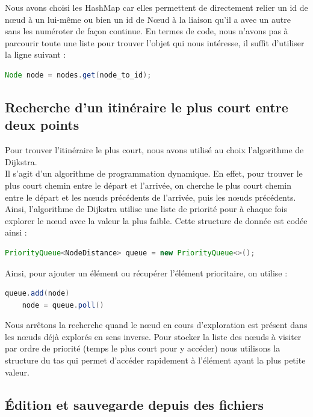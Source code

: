 \documentclass[12pt, titlepage]{article}
\begin{document}
Nous avons choisi les HashMap car elles permettent de directement relier un id de nœud à un lui-même ou bien un id de Nœud à la liaison qu'il a avec un autre sans les numéroter de façon continue. En termes de code, nous n'avons pas à parcourir toute une liste pour trouver l'objet qui nous intéresse, il suffit d'utiliser la ligne suivant :

\begin{lstlisting}[language=java]
Node node = nodes.get(node_to_id);
\end{lstlisting}

\subsection{Recherche d'un itinéraire le plus court entre deux points}

 Pour trouver l'itinéraire le plus court, nous avons utilisé au choix l'algorithme de Dijkstra. \\

Il s'agit d'un algorithme de programmation dynamique. En effet, pour trouver le plus court chemin entre le départ et l'arrivée, on cherche le plus court chemin entre le départ et les nœuds précédents de l'arrivée, puis les nœuds précédents.
Ainsi, l'algorithme de Dijkstra utilise une liste de priorité pour à chaque fois explorer le nœud  avec la valeur la plus faible. Cette structure de donnée est codée ainsi :
\begin{lstlisting}[language=java]
    PriorityQueue<NodeDistance> queue = new PriorityQueue<>();
\end{lstlisting}

Ainsi, pour ajouter un élément ou récupérer l'élément prioritaire, on utilise :
\begin{lstlisting}[language=java]
    queue.add(node)
    node = queue.poll()
\end{lstlisting}

Nous arrêtons la recherche quand le nœud en cours d'exploration est présent dans les nœuds déjà explorés en sens inverse. Pour stocker la liste des nœuds à visiter par ordre de priorité (temps le plus court pour y accéder) nous utilisons la structure du tas qui permet d'accéder rapidement à l'élément ayant la plus petite valeur.


\subsection{Édition et sauvegarde depuis des fichiers}
\end{document}
